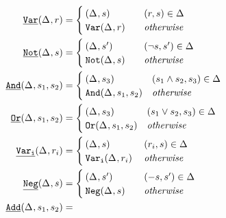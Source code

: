 \newcommand{\wrappedprimspacer}{\mbox{\hspace{1.8cm}} & \\[-3.25ex]}
\centering
\begin{align*}
\pwrap{\pspawn}(\aStore{},r) &=
  \begin{cases}
    \wrappedprimspacer
    (\aStore{},s) & (r,s) \in \aStore{} \\
    \pspawn(\aStore{},r) & \mathit{otherwise}
  \end{cases} \\
\pwrap{\pnot}(\aStore{},s) &=
  \begin{cases}
    \wrappedprimspacer
    (\aStore{},s') & (\neg s, s') \in \aStore{} \\
    \pnot(\aStore{},s) & \mathit{otherwise}
  \end{cases} \\
\pwrap{\pand}(\aStore{},s_1,s_2) &=
  \begin{cases}
    \wrappedprimspacer
    (\aStore{},s_3) & (s_1 \wedge s_2, s_3) \in \aStore{} \\
    \pand(\aStore{},s_1,s_2) & \mathit{otherwise}
  \end{cases} \\
\pwrap{\por}(\aStore{},s_1,s_2) &=
  \begin{cases}
    \wrappedprimspacer
    (\aStore{},s_3) & (s_1 \vee s_2, s_3) \in \aStore{} \\
    \por(\aStore{},s_1,s_2) & \mathit{otherwise}
  \end{cases} \\
%
\pwrap{\pspawni}(\aStore{},r_{i}) &=
                               \begin{cases}
                                 \wrappedprimspacer
                                 (\aStore{},s) & (r_{i},s) \in \aStore{} \\
                                 \pspawni(\aStore{},r_{i}) & \mathit{otherwise}
                               \end{cases} \\
\pwrap{\pneg}(\aStore{},s) &=
                               \begin{cases}
                                 \wrappedprimspacer
                                 (\aStore{},s') & (-s, s') \in \aStore{} \\
                                 \pneg(\aStore{},s) & \mathit{otherwise}
                               \end{cases} \\
\pwrap{\padd}(\aStore{},s_1,s_2) &=

\end{align*}
